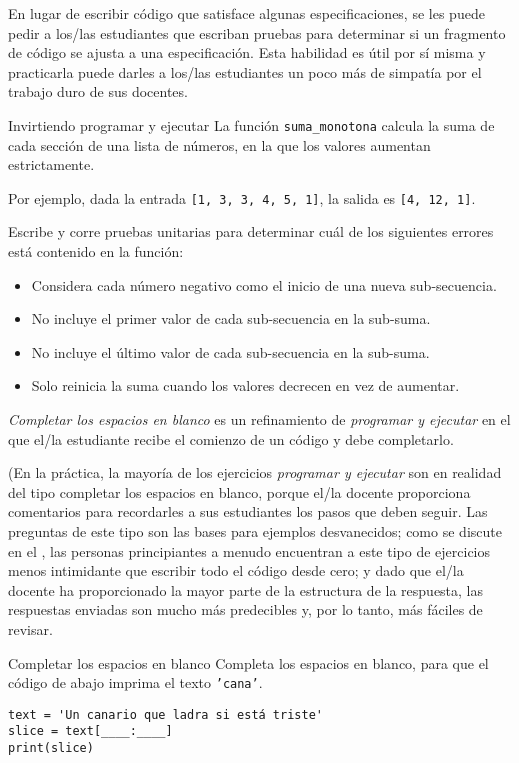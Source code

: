 En lugar de escribir código que satisface algunas especificaciones,  
se les puede pedir a los/las estudiantes que escriban pruebas para determinar si un fragmento de código se ajusta a una especificación. 
Esta habilidad es útil por sí misma y practicarla puede darles a los/las estudiantes un poco más de simpatía por el trabajo duro de sus docentes.

\begin{aside}{Invirtiendo programar y ejecutar}
 La función \texttt{suma\_monotona} calcula la suma de cada sección de una lista de números, en la que los valores aumentan estrictamente.

Por ejemplo,
  dada la entrada \texttt{[1,\ 3,\ 3,\ 4,\ 5,\ 1]},
  la salida es  \texttt{[4,\ 12,\ 1]}.

Escribe y corre pruebas unitarias para determinar cuál de los siguientes errores está contenido en la función:

   \begin{itemize}
  \item
    Considera cada número negativo como el inicio de una nueva sub-secuencia.
  \item
    No incluye el primer valor de cada sub-secuencia en la sub-suma.
  \item
    No incluye el último valor de cada sub-secuencia en la sub-suma.
  \item
    Solo reinicia la suma cuando los valores decrecen en vez de aumentar.
  \end{itemize}
\end{aside}


\emph{Completar los espacios en blanco} es un refinamiento de \emph{programar y ejecutar}
en el que el/la estudiante recibe el comienzo de un código y debe completarlo.

(En la práctica, la mayoría de los ejercicios \emph{programar y ejecutar} son en realidad del tipo completar los espacios en blanco, porque el/la docente proporciona comentarios
para recordarles a sus estudiantes los pasos que deben seguir. 
Las preguntas de este tipo son las bases para ejemplos desvanecidos;
como se discute en el ,
las personas principiantes a menudo encuentran a este tipo de ejercicios  menos intimidante que escribir todo el código desde cero;
y dado que el/la docente ha proporcionado la mayor parte de la estructura de la respuesta,
las respuestas enviadas son mucho más predecibles y, por lo tanto, más fáciles de revisar.

\begin{aside}{Completar los espacios en blanco}
 Completa los espacios en blanco,
 para que el código de abajo imprima el texto  \texttt{'cana'}.

\begin{verbatim}
text = 'Un canario que ladra si está triste'
slice = text[____:____]
print(slice)
\end{verbatim}
\end{aside}

